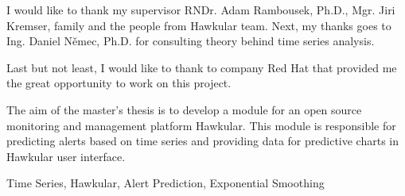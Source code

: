 \documentclass[12pt,oneside]{fithesis2}
\begin{document}
\FrontMatter                    %
\ThesisTitlePage                %
\begin{ThesisDeclaration}       %
  \DeclarationText
  \AdvisorName
\end{ThesisDeclaration}

\begin{ThesisThanks}            %
  I would like to thank my supervisor RNDr. Adam Rambousek, Ph.D., Mgr. Jiri Kremser,
  family and the people from Hawkular team. Next, my thanks goes to Ing. Daniel Němec, Ph.D.
  for consulting theory behind time series analysis.

  Last but not least, I would like to thank to company Red Hat that provided me 
  the great opportunity to work on this project.
\end{ThesisThanks}

\begin{ThesisAbstract}          %
  The aim of the master's thesis is to develop a module for an open source monitoring
  and management platform Hawkular. This module is responsible for predicting
  alerts based on time series and providing data for predictive charts in Hawkular user interface.
\end{ThesisAbstract}

\begin{ThesisKeyWords}          %
  Time Series, Hawkular, Alert Prediction, Exponential Smoothing
\end{ThesisKeyWords}

\tableofcontents                %

\MainMatter                     %

    


\appendix

\end{document}
